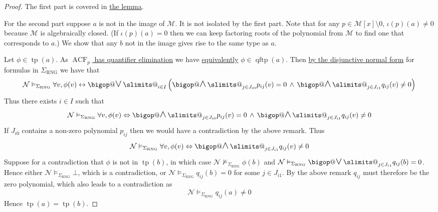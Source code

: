 \documentclass{book}
\makeatletter
\newcommand{\brkt}[1]{\left(#1\right)}
\renewcommand{\iff}{\Leftrightarrow}
\newcommand{\IFF}{\leftrightarrow}
\newcommand{\AND}{\, \land \,}
\DeclareRobustCommand\bigop[1]{%
  \mathop{\vphantom{\sum}\mathpalette\bigop@{#1}}\slimits@
}
\newcommand{\bigop@}[2]{%
  \vcenter{%
    \sbox\z@{$#1\sum$}%
    \hbox{\resizebox{
      \ifx#1\displaystyle.7\fi\dimexpr\ht\z@+\dp\z@}{!}{$\m@th#2$}}%
  }%
}
\newcommand{\bigand}[2]{\DOTSB\bigop{\mbox{\Large$\land$}}_{#1}^{#2}}
\newcommand{\bigor}[2]{\DOTSB\bigop{\mbox{\Large$\lor$}}_{#1}^{#2}}
\newcommand{\io}{\iota}
\newcommand{\Si}{\Sigma}
\newcommand{\MM}{\mathcal{M}}
\newcommand{\NN}{\mathcal{N}}
\newcommand{\<}{\langle}
\renewcommand{\>}{\rangle}
\newcommand{\model}[1]{\vDash_{#1}}
\newcommand{\nodel}[1]{\nvDash_{#1}}
\newcommand{\RNG}{\mathrm{RNG}}
\DeclareMathOperator{\ACF}{ACF}
\DeclareMathOperator{\tp}{tp}
\DeclareMathOperator{\qftp}{qftp}
\newcommand{\linkto}[2]{\hyperlink{#1}{#2}}
\theoremstyle{definitionstyle}
\theoremstyle{exercisestyle}
\theoremstyle{remarkstyle}
\makeatother
\begin{document}
\begin{proof}
    The first part is covered in 
    \linkto{type_of_an_element_from_the_model}{the lemma}.

    For the second part suppose $a$ is not in the image of $\MM$.
    It is not isolated by the first part.
    Note that for any $p \in \MM[x] \setminus {0}$, 
    $\io(p)(a) \ne 0$ because $\MM$ is algebraically closed. 
    (If $\io(p)(a) = 0$ then we can keep factoring roots of the polynomial
    from $\MM$ to find one that corresponds to $a$.)
    We show that any $b$ not in the image gives rise to the same type as $a$.

    Let $\phi \in \tp(a)$.
    As \linkto{ACF_has_quantifier_elimination}{
        $\ACF_p$ has quantifier elimination}
    we have \linkto{quant_elim_for_types}{equivalently}
    $\phi \in \qftp(a)$.
    Then \linkto{disjunctive_normal_form}{by the disjunctive normal form} 
    for formulas in $\Si_\RNG$ we have that 
    \[ 
        \NN \model{\Si_\RNG} \forall v, \phi(v) 
        \IFF \bigor{i \in I}{} 
        \brkt{\bigand{j \in J_{i0}}{} p_{ij}(v) = 0 \AND 
        \bigand{j \in J_{i1}}{} q_{ij}(v) \ne 0}
    \]
    Thus there exists $i \in I$ such that 
    \[ 
        \NN \model{\Si_\RNG} \forall v, \phi(v) \iff
        \bigand{j \in J_{i0}}{} p_{ij}(v) = 0 \AND 
        \bigand{j \in J_{i1}}{} q_{ij}(v) \ne 0
    \]
    If $J_{i0}$ contains a non-zero polynomial $p_{ij}$ then we would have a 
    contradiction by the above remark.
    Thus 
    \[ 
        \NN \model{\Si_\RNG} \forall v, \phi(v) \iff
        \bigand{j \in J_{i1}}{} q_{ij}(v) \ne 0
    \]
    Suppose for a contradiction
    that $\phi$ is not in $\tp(b)$, 
    in which case $\NN \nodel{\Si_\RNG} \phi(b)$
    and $\NN \model{\Si_\RNG} \bigor{j \in J_{i1}}{} q_{ij}(b) = 0$.
    Hence either $\NN \model{\Si_\RNG} \bot$, which is a contradiction,
    or $\NN \model{\Si_\RNG} q_{ij}(b) = 0$ for some $j \in J_{i1}$.
    By the above remark $q_{ij}$ must therefore be the zero polynomial,
    which also leads to a contradiction as 
    \[ 
        \NN \model{\Si_\RNG} q_{ij}(a) \ne 0
    \]
    Hence $\tp(a) = \tp(b)$.
\end{proof}

\printbibliography
\end{document}
